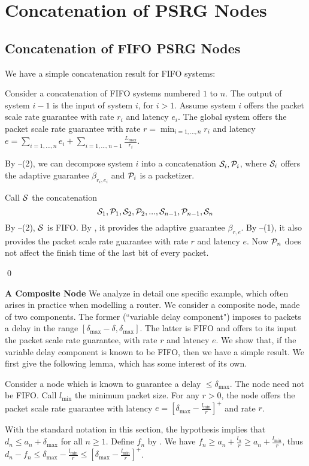 \section{Concatenation of PSRG Nodes}

\subsection{Concatenation of FIFO PSRG Nodes}
We have a simple concatenation result for FIFO systems:
\begin{theorem}
Consider a concatenation of FIFO systems numbered $1$ to $n$.
The output of system $i-1$ is the input of system $i$, for
$i>1$. Assume system $i$ offers the packet scale rate
guarantee with rate $r_i$ and latency $e_i$. The global system
offers the packet scale rate guarantee with rate
$r=\min_{i=1,...,n} r_i$ and latency $e= \sum_{i=1,...,n} e_i
+ \sum_{i=1,...,n-1}\frac{L_{\max}}{r_i}$. 
\end{theorem}
 \pr
 By --(2), we can decompose system $i$ into a
concatenation $\mathcal S_i, \mathcal P_i$, where $\mathcal S_i$ offers the
adaptive guarantee $\beta_{r_i,e_i}$ and $\mathcal P_i$ is a
packetizer.

Call $\mathcal S$ the concatenation
 $$\mathcal S_1, \mathcal P_1, \mathcal S_2,
\mathcal P_2,...,\mathcal S_{n-1},\mathcal P_{n-1},\mathcal S_n$$ By
--(2), $\mathcal S$ is FIFO. By
, it provides the adaptive guarantee
$\beta_{r,e}$. By --(1), it also provides
the packet scale rate guarantee with rate $r$ and latency $e$.
Now $\mathcal P_n$ does not affect the finish time of the last bit
of every packet.

\qed

\textbf{A Composite Node} We analyze in detail one specific
example, which often arises in practice when modelling a
router. We consider a composite node, made of two components.
The former (``variable delay component") imposes to packets a
delay in the range $[\delta_{\max}-\delta, \delta_{\max}]$.
The latter is FIFO and offers to its input the packet scale
rate guarantee, with rate $r$ and latency $e$. We show that,
if the variable delay component is known to be FIFO, then we
have a simple result. We first give the following lemma, which
has some interest of its own.

\begin{lemma}
 Consider a node which is known to
guarantee a delay $\leq \delta_{\max}$. The node need not be
FIFO. Call $l_{\min}$ the minimum packet size. For any $r>0$,
the node offers the packet scale rate guarantee with latency
$e=[\delta_{\max}-\frac{l_{\min}}{r}]^+$ and rate $r$.
\end{lemma}
\begin{preuve} With the standard notation in this section, the
hypothesis implies that $d_n \leq a_n + \delta_{\max}$ for all
$n \geq 1$. Define $f_n$  by . We have
$f_n\geq a_n + \frac{l_n}{r} \geq a_n + \frac{l_{\min}}{r}$,
thus $d_n-f_n \leq \delta_{\max} - \frac{l_{\min}}{r}\leq
[\delta_{\max}-\frac{l_{\min}}{r}]^+$. \end{preuve}

